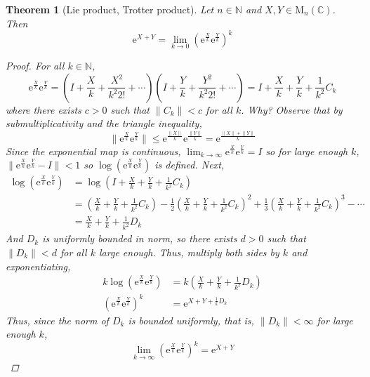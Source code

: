 \documentclass[letterpaper, 10pt]{article}
\theoremstyle{theostyle}
\newtheorem{theorem}{Theorem}[section]
\newenvironment{thmstyle}[1][]{%
    \begin{theorem}[#1]\leavevmode\vspace{-\baselineskip}\myquote%
    }{\endmyquote\end{theorem}}
\begin{document}
\begin{thmstyle}[Lie product, Trotter product]
    Let \(n \in \mathbb{N}\) and \(X,Y \in \mathrm{M}_n(\mathbb{C})\).
    Then \[\mathrm{e}^{X+Y} = \lim_{k \to 0} \left(\mathrm{e}^{\frac{X}{k}} \mathrm{e}^{\frac{Y}{k}}\right)^k\]

    \begin{proof}
        For all \(k \in \mathbb{N}\),
        \[\mathrm{e}^{\frac{X}{k}} \mathrm{e}^{\frac{Y}{k}} = \left(I + \frac{X}{k} + \frac{X^2}{k^2 2!} + \cdots \right) \left(I + \frac{Y}{k} + \frac{Y^2}{k^2 2!} + \cdots \right) 
        = I + \frac{X}{k} + \frac{Y}{k} + \frac{1}{k^2}C_k\]
        where there exists \(c > 0\) such that \(\lVert C_k \rVert < c\) for all \(k\).
        Why?
        Observe that by submultiplicativity and the triangle inequality,
        \[\lVert \mathrm{e}^{\frac{X}{k}} \mathrm{e}^{\frac{Y}{k}}\rVert \leq \mathrm{e}^{\frac{\lVert X \rVert}{k}} \mathrm{e}^{\frac{\lVert Y \rVert}{k}} = \mathrm{e}^{\frac{\lVert X \rVert + \lVert Y \rVert}{k}}\]
        Since the exponential map is continuous, \(\displaystyle \lim_{k \to \infty} \mathrm{e}^{\frac{X}{k}} \mathrm{e}^{\frac{Y}{k}} = I\) so for large enough \(k\),
        \(\lVert \mathrm{e}^{\frac{X}{k}} \mathrm{e}^{\frac{Y}{k}} - I\rVert < 1\) so \(\log\left(\mathrm{e}^{\frac{X}{k}} \mathrm{e}^{\frac{Y}{k}}\right)\) is defined.
        Next,
        \begin{align*}
            \log{\left(\mathrm{e}^{\frac{X}{k}}\mathrm{e}^{\frac{Y}{k}}\right)} &= \log{\left(I + \frac{X}{k} + \frac{Y}{k} + \frac{1}{k^2} C_k\right)} \\
            &= \left(\frac{X}{k} + \frac{Y}{k} + \frac{1}{k^2} C_k\right) - \frac{1}{2}\left(\frac{X}{k} + \frac{Y}{k} + \frac{1}{k^2} C_k\right)^2 + \frac{1}{3}\left(\frac{X}{k} + \frac{Y}{k} + \frac{1}{k^2} C_k\right)^3 - \cdots \\
            &= \frac{X}{k} + \frac{Y}{k} + \frac{1}{k^2} D_k
        \end{align*}
        And \(D_k\) is uniformly bounded in norm, so there exists \(d > 0\) such that \(\lVert D_k\rVert < d\) for all \(k\) large enough.
        Thus, multiply both sides by \(k\) and exponentiating,
        \begin{align*}
            k \log{\left(\mathrm{e}^{\frac{X}{k}} \mathrm{e}^{\frac{Y}{k}}\right)} &= k \left(\frac{X}{k} + \frac{Y}{k} + \frac{1}{k^2} D_k\right) \\
            \left(\mathrm{e}^{\frac{X}{k}} \mathrm{e}^{\frac{Y}{k}}\right)^k &= \mathrm{e}^{X + Y + \frac{1}{k} D_k}
        \end{align*}
        Thus, since the norm of \(D_k\) is bounded uniformly, that is, \(\lVert D_k \rVert < \infty\) for large enough \(k\),
        \[\lim_{k \to \infty} \left(\mathrm{e}^{\frac{X}{k}} \mathrm{e}^{\frac{Y}{k}}\right)^k = \mathrm{e}^{X + Y}\]
    \end{proof}
\end{thmstyle}
\end{document}
